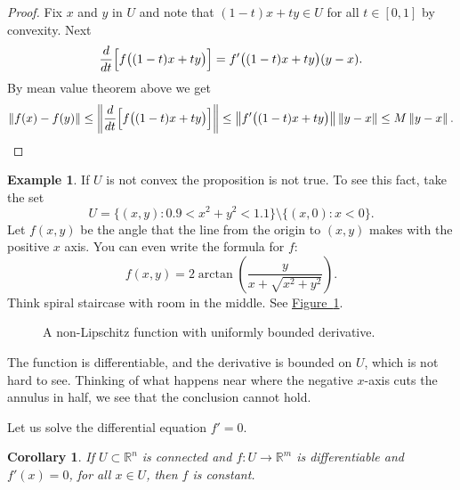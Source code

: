 \documentclass[12pt]{book}
\newcommand{\norm}[1]{\left\lVert {#1} \right\rVert}
\newcommand{\R}{{\mathbb{R}}}
\theoremstyle{plain}
\newtheorem{cor}[thm]{Corollary}
\theoremstyle{remark}
\theoremstyle{definition}
\theoremstyle{exercise}
\theoremstyle{example}
\newtheorem{example}[thm]{Example}
\newcommand{\figureref}[1]{\hyperref[#1]{Figure~\ref*{#1}}}
\begin{document}
\begin{proof}
Fix $x$ and $y$ in $U$ and note that
$(1-t)x+ty \in U$ for all $t \in [0,1]$
by convexity.
Next
\begin{equation*}
\frac{d}{dt} \Bigl[f\bigl((1-t)x+ty\bigr)\Bigr]
=
f'\bigl((1-t)x+ty\bigr) (y-x) .
\end{equation*}
By mean value theorem above we get
\begin{equation*}
\norm{f(x)-f(y)} \leq
\norm{\frac{d}{dt} \Bigl[ f\bigl((1-t)x+ty\bigr) \Bigr] } \leq
\norm{f'\bigl((1-t)x+ty\bigr)} \norm{y-x} \leq
M \norm{y-x} . \qedhere
\end{equation*}
\end{proof}

\begin{example}
If $U$ is not convex the proposition is not true.  To see this fact, take
the set
\begin{equation*}
U = \{ (x,y) : 0.9 < x^2+y^2 < 1.1 \} \setminus \{ (x,0) : x < 0 \} .
\end{equation*}
Let $f(x,y)$ be the angle that the line from the origin to $(x,y)$
makes with the positive $x$ axis.  You can even write the formula for $f$:
\begin{equation*}
f(x,y) = 2 \operatorname{arctan}\left( \frac{y}{x+\sqrt{x^2+y^2}}\right) .
\end{equation*}
Think spiral staircase with room in the middle.  See
\figureref{mv:fignonlip}.

\begin{figure}[h!t]
\begin{center}

\caption{A non-Lipschitz function with uniformly bounded
derivative.\label{mv:fignonlip}}
\end{center}
\end{figure}

The function is differentiable,
and the derivative is bounded on $U$, which is not hard to see.   Thinking of
what happens near where the negative $x$-axis cuts the annulus in half,
we see that the conclusion cannot hold.
\end{example}

Let us solve the differential equation $f' = 0$.

\begin{cor}
If $U \subset \R^n$ is connected and $f \colon U \to \R^m$ is differentiable
and $f'(x) = 0$, for all $x \in U$, then $f$ is constant.
\end{cor}
\end{document}

